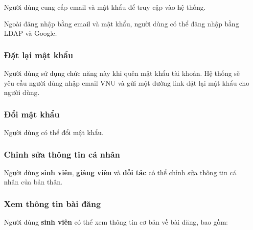 \documentclass[./../main.tex]{subfiles}
\begin{document}
Người dùng cung cấp email và mật khẩu để truy cập vào hệ thống.
  
Ngoài đăng nhập bằng email và mật khẩu, người dùng có thể đăng nhập bằng
LDAP và Google.
  
\hypertarget{ux111ux1eb7t-lux1ea1i-mux1eadt-khux1ea9u}{%
	\subsubsection{Đặt lại mật
		khẩu}\label{ux111ux1eb7t-lux1ea1i-mux1eadt-khux1ea9u}}
  
Người dùng sử dụng chức năng này khi quên mật khẩu tài khoản. Hệ thống
sẽ yêu cầu người dùng nhập email VNU và gửi một đường link đặt lại mật
khẩu cho người dùng.
  
\hypertarget{ux111ux1ed5i-mux1eadt-khux1ea9u}{%
	\subsubsection{Đổi mật khẩu}\label{ux111ux1ed5i-mux1eadt-khux1ea9u}}
  
Người dùng có thể đổi mật khẩu.
  
\hypertarget{chux1ec9nh-sux1eeda-thuxf4ng-tin-cuxe1-nhuxe2n}{%
	\subsubsection{Chỉnh sửa thông tin cá
		nhân}\label{chux1ec9nh-sux1eeda-thuxf4ng-tin-cuxe1-nhuxe2n}}
  
Người dùng \textbf{sinh viên}, \textbf{giảng viên} và \textbf{đối tác}
có thể chỉnh sửa thông tin cá nhân của bản thân.
  
\hypertarget{xem-thuxf4ng-tin-buxe0i-ux111ux103ng}{%
	\subsubsection{Xem thông tin bài
		đăng}\label{xem-thuxf4ng-tin-buxe0i-ux111ux103ng}}
  
Người dùng \textbf{sinh viên} có thể xem thông tin cơ bản về bài đăng,
bao gồm:
  
\end{document}
